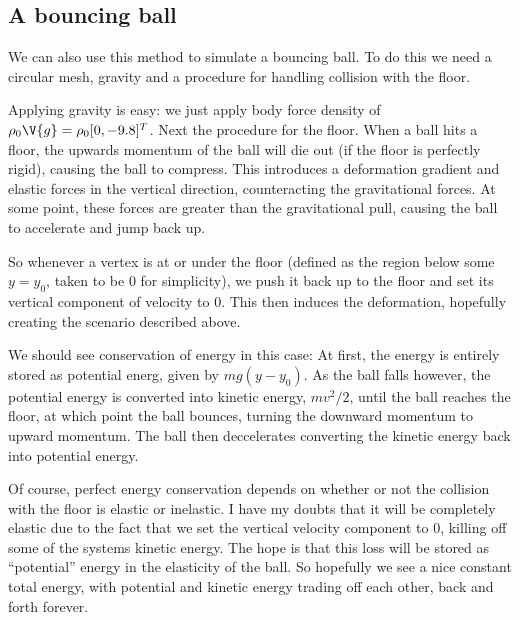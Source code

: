 \documentclass[sigconf]{acmart}
\begin{document}
\subsection{A bouncing ball}
We can also use this method to simulate a bouncing ball. To do this we need a circular mesh, gravity and a procedure for handling collision with the floor.

Applying gravity is easy: we just apply body force density of $ \rho_0\V{g}=\rho_0[0, -9.8]^T $. Next the procedure for the floor. When a ball hits a floor, the upwards momentum of the ball will die out (if the floor is perfectly rigid), causing the ball to compress. This introduces a deformation gradient and elastic forces in the vertical direction, counteracting the gravitational forces. At some point, these forces are greater than the gravitational pull, causing the ball to accelerate and jump back up.

So whenever a vertex is at or under the floor (defined as the region below some $ y=y_0 $, taken to be $ 0 $ for simplicity), we push it back up to the floor and set its vertical component of velocity to 0. This then induces the deformation, hopefully creating the scenario described above.

We should see conservation of energy in this case: At first, the energy is entirely stored as potential energ, given by $ mg(y-y_0) $. As the ball falls however, the potential energy is converted into kinetic energy, $ mv^2/2 $, until the ball reaches the floor, at which point the ball bounces, turning the downward momentum to upward momentum. The ball then deccelerates converting the kinetic energy back into potential energy.

Of course, perfect energy conservation depends on whether or not the collision with the floor is elastic or inelastic. I have my doubts that it will be completely elastic due to the fact that we set the vertical velocity component to 0, killing off some of the systems kinetic energy. The hope is that this loss will be stored as ``potential'' energy in the elasticity of the ball. So hopefully we see a nice constant total energy, with potential and kinetic energy trading off each other, back and forth forever.
\end{document}
